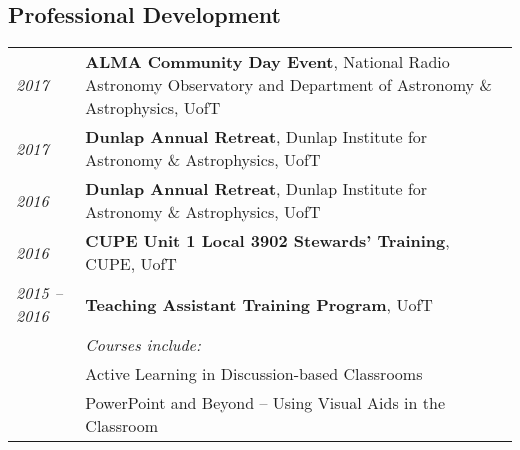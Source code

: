 \documentclass[10pt]{res} %
\begin{document}
\begin{resume}

\section{\Large Professional Development}
\vspace{-5pt} %
\noindent\makebox[\linewidth]{\rule{\textwidth}{0.4pt}}
\vspace{-20pt} %

\begin{table}[h]
\begin{tabularx}{\textwidth}{lX}
\textit{2017} & \textbf{ALMA Community Day Event}, National Radio Astronomy Observatory and Department of Astronomy \& Astrophysics, UofT \\
\textit{2017} & \textbf{Dunlap Annual Retreat}, Dunlap Institute for Astronomy \& Astrophysics, UofT \\
\textit{2016} & \textbf{Dunlap Annual Retreat}, Dunlap Institute for Astronomy \& Astrophysics, UofT \\
\textit{2016} & \textbf{CUPE Unit 1 Local 3902 Stewards' Training}, CUPE, UofT \\
\textit{2015 -- 2016} & \textbf{Teaching Assistant Training Program}, UofT \\
				& \textit{Courses include:} \\
                                  & Active Learning in Discussion-based Classrooms \\
                                  & PowerPoint and Beyond -- Using Visual Aids in the Classroom
\end{tabularx}
\end{table}


\end{resume}
\end{document}

